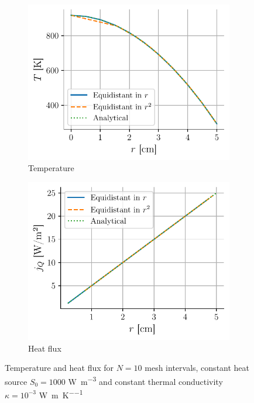\begin{figure}[h]
    \centering
    \begin{subfigure}{0.5\linewidth}
        \centering
        \includegraphics[width=\linewidth]{figures/temperature_exact.pdf}
        \caption{Temperature}
        \label{fig:temperature_exact}
    \end{subfigure}
    \begin{subfigure}{0.48\linewidth}
        \centering
        \includegraphics[width=\linewidth]{figures/heat_exact.pdf}
        \caption{Heat flux}
        \label{fig:heat_exact}
    \end{subfigure}
    \caption{Temperature and heat flux for \(N = 10\) mesh intervals, constant heat source \(S_0 = 1000\) \si{\watt\per\meter\cubed} and constant thermal conductivity \(\kappa = 10^{-3}\) \si{\watt\per\meter\per\kelvin}}
\end{figure}
